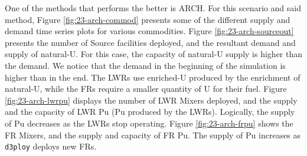 \documentclass[11pt]{article}
\newcommand{\deploy}{\texttt{d3ploy}\xspace}%
\begin{document}
One of the methods that performs the better is ARCH. For this scenario and said method, Figure \ref{fig:23-arch-commod} presents some of the different supply and demand time series plots for various commodities.
Figure \ref{fig:23-arch-sourceout} presents the number of Source facilities deployed, and the resultant demand and supply of natural-U. For this case, the capacity of natural-U supply is higher than the demand. We notice that the demand in the beginning of the simulation is higher than in the end. The LWRs use enriched-U produced by the enrichment of natural-U, while the FRs require a smaller quantity of U for their fuel. Figure \ref{fig:23-arch-lwrpu} displays the number of LWR Mixers deployed, and the supply and the capacity of LWR Pu (Pu produced by the LWRs). Logically, the supply of Pu decreases as the LWRs stop operating. Figure \ref{fig:23-arch-frpu} shows the FR Mixers, and the supply and capacity of FR Pu. The supply of Pu increases as \deploy deploys new FRs.
\end{document}
